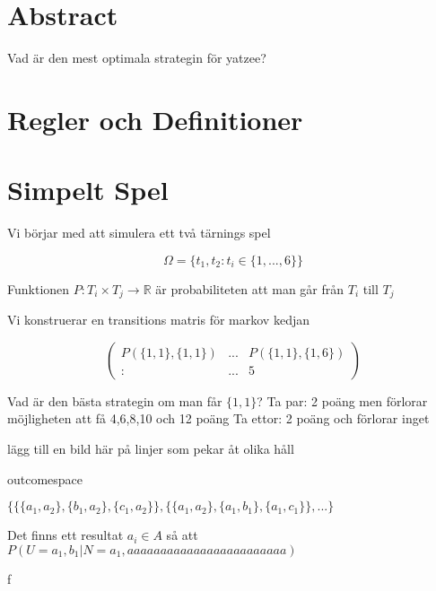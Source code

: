 \documentclass[a4paper,12pt]{article}
\begin{document}
\section{Abstract}
Vad är den mest optimala strategin för yatzee?

\section{Regler och Definitioner}



\section{Simpelt Spel}
Vi börjar med att simulera ett två tärnings spel

\begin{equation}
    \Omega=\{t_1,t_2:t_i\in\{1,...,6\}\}
\end{equation}

Funktionen $P:T_i\times T_j \rightarrow \mathds{R}$ är probabiliteten att man går från $T_i$ till $T_j$


Vi konstruerar en transitions matris för markov kedjan

$$
\begin{pmatrix}
    P(\{1,1\},\{1,1\})&...&P(\{1,1\},\{1,6\})\\
    :&...&5
\end{pmatrix}
$$

Vad är den bästa strategin om man får $\{1,1\}$?
Ta par: 2 poäng men förlorar möjligheten att få 4,6,8,10 och 12 poäng
Ta ettor: 2 poäng och förlorar inget

lägg till en bild här på linjer som pekar åt olika håll

outcomespace

$\{\{\{a_1,a_2\},\{b_1,a_2\},\{c_1,a_2\}\},\{\{a_1,a_2\},\{a_1,b_1\},\{a_1,c_1\}\},...\}$

Det finns ett resultat $a_i\in A$ så att 
$P(U={a_1,b_1}|N={a_1,aaaaaaaaaaaaaaaaaaaaaaaa})$

f
\end{document}
